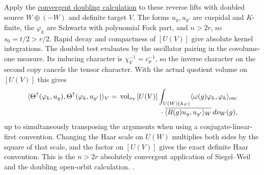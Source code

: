 Apply the \hyperlink{proof.unitary-doubling-identity}{convergent
doubling calculation} to these reverse lifts with doubled source
\(W\oplus(-W)\) and definite target \(V\). The forms \(u_y,u_{y'}\)
are cuspidal and \(K\)-finite, the \(\varphi_k\) are Schwartz with
polynomial Fock part, and \(n>2r\), so \(s_0=t/2>r/2\). Rapid decay
and compactness of \([U(V)]\) give absolute kernel integrations.
The doubled test evaluates by the oscillator pairing in the
covolume-one measure. Its inducing character is
\(\chi_V^{-1}=c_\mu^{-1}\), so the inverse character on the second
copy cancels the tensor character. With the actual quotient volume
on \([U(V)]\) this gives
\begin{equation}
\label{eq:actual-stage-upward-norm}
\begin{split}
 \langle\Theta^\uparrow(\varphi_k,u_y),
        \Theta^\uparrow(\varphi_k,u_{y'})\rangle_V
 ={}&\operatorname{vol}_{\nu_V}[U(V)]
 \int_{U(W)(\mathbb A_F)}
 \langle\omega(g)\varphi_k,\varphi_k\rangle_{\rm osc}\\[-2pt]
 &\hspace{20mm}\cdot
     \overline{\langle R(g)u_y,u_{y'}\rangle_W}\,d\nu_W(g),
\end{split}
\end{equation}
up to simultaneously transposing the arguments when using a
conjugate-linear-first convention. Changing the Haar scale on
\(U(W)\) multiplies both sides by the square of that scale,
and the factor on \([U(V)]\) gives the exact definite Haar
convention. This is the \(n>2r\) absolutely convergent
application of Siegel--Weil and the doubling open-orbit
calculation.
\cite[\S\S3.1, 7.1, 11.3, 11.5, Theorem~7.1]{gqt}
.

